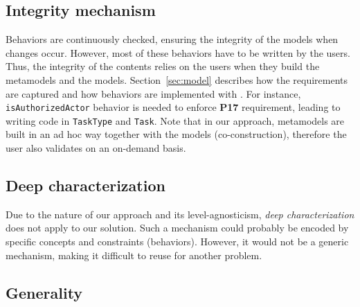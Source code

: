 

  \subsection{Integrity mechanism}


  Behaviors are continuously checked, ensuring the integrity of the models when
  changes occur. However, most of these behaviors have to be written by the
  users. Thus, the integrity of the contents relies on the users when they
  build the metamodels and the models. Section~\ref{sec:model} describes
  how the requirements are captured and how behaviors are implemented with
  \FML. For instance, \texttt{isAuthorizedActor} behavior is needed to enforce
  \textbf{P17} requirement, leading to writing \FML code in \texttt{TaskType}
  and \texttt{Task}. Note that in our approach, metamodels are built in an
 ad hoc way together with the models (co-construction), therefore the user
  also validates on an on-demand basis.

  \subsection{Deep characterization}



  Due to the nature of our approach and its level-agnosticism, \emph{deep
  characterization} does not apply to our solution. Such a mechanism could
  probably be encoded by specific concepts and constraints (behaviors).
  However, it would not be a generic mechanism, making it difficult to reuse
  for another problem.

  \subsection{Generality}


